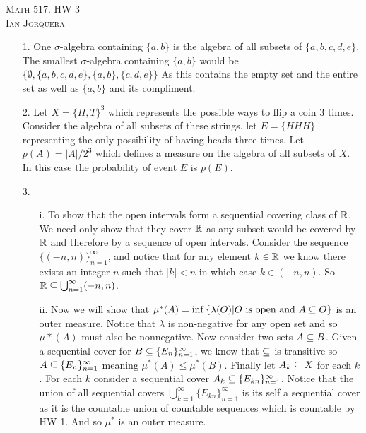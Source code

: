 \documentclass[12pt]{amsart}
\begin{document}
\begin{center}
   \textsc{Math 517. HW 3\\ Ian Jorquera}
\end{center}
\vspace{1em}

\begin{itemize}
   \item[1.] One $\sigma$-algebra containing $\{a,b\}$ is the algebra of all subsets of $\{a,b,c,d,e\}$.
             The smallest $\sigma$-algebra containing $\{a,b\}$ would be 
             $\{\emptyset, \{a,b,c,d,e\}, \{a,b\}, \{c,d,e\}\}$
             As this contains the empty set and the entire set as well as $\{a,b\}$ and its compliment.


   \item[2.] Let $X=\{H,T\}^3$ which represents the possible ways to flip a coin $3$ times. 
             Consider the algebra of all subsets of these strings. let $E=\{HHH\}$ representing
             the only possibility of having heads three times.
             Let $p(A)=|A|/2^3$ which defines a measure on the algebra of all subsets of $X$. In this case
             the probability of event $E$ is $p(E)$.


   \item[3.]
   \begin{itemize}
    \item[i.] To show that the open intervals form a sequential covering class of $\mathbb{R}$. 
    We need only show that they cover $\mathbb{R}$ as any subset would be covered by $\mathbb{R}$ 
    and therefore by a sequence of open intervals. Consider the sequence $\{(-n,n)\}_{n=1}^\infty$, 
    and notice that for any element $k\in \mathbb{R}$ we know there exists an integer 
    $n$ such that $|k|<n$ in which case $k\in (-n,n)$. So $\mathbb{R}\subseteq \bigcup_{n=1}^\infty (-n,n)$.

    \item[ii.] Now we will show that 
    $\mu^*(A)=\inf\left\{\lambda(O) | O \text{ is open and } A\subseteq O\right\}$ is an outer 
    measure. Notice that $\lambda$ is non-negative for any open set and so $\mu*(A)$ must also be nonnegative.
    Now consider two sets $A\subseteq B$. Given a sequential cover for $B\subseteq \{E_n\}_{n=1}^\infty$, we know
    that $\subseteq$ is transitive so $A\subseteq \{E_n\}_{n=1}^\infty$ meaning $\mu^*(A)\leq \mu^*(B)$. Finally let $A_k\subseteq X$ for each $k$.
    For each $k$ consider a sequential cover $A_k\subseteq \{E_{kn}\}_{n=1}^\infty$. Notice that the union
    of all sequential covers $\bigcup_{k=1}^\infty\{E_{kn}\}_{n=1}^\infty$ is its self a sequential cover
    as it is the countable union of countable sequences which is countable by HW 1. And so $\mu^*$ is an 
    outer measure.
               

\end{itemize}
\end{itemize}
\end{document}
